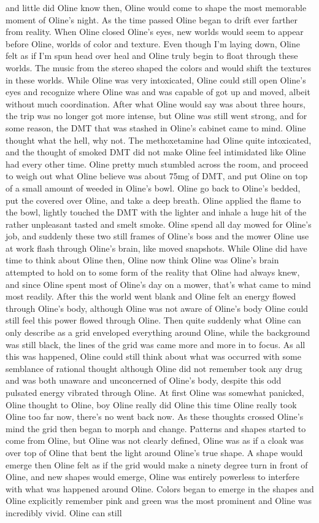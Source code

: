 \documentclass[12pt]{book}
\begin{document}
and little did Oline know then, Oline would come to shape the most memorable moment of Oline's night. As the time passed Oline began to drift ever farther from reality. When Oline closed Oline's eyes, new worlds would seem to appear before Oline, worlds of color and texture. Even though I'm laying down, Oline felt as if I'm spun head over heal and Oline truly begin to float through these worlds. The music from the stereo shaped the colors and would shift the textures in these worlds. While Oline was very intoxicated, Oline could still open Oline's eyes and recognize where Oline was and was capable of got up and moved, albeit without much coordination. After what Oline would say was about three hours, the trip was no longer got more intense, but Oline was still went strong, and for some reason, the DMT that was stashed in Oline's cabinet came to mind. Oline thought what the hell, why not. The methoxetamine had Oline quite intoxicated, and the thought of smoked DMT did not make Oline feel intimidated like Oline had every other time. Oline pretty much stumbled across the room, and proceed to weigh out what Oline believe was about 75mg of DMT, and put Oline on top of a small amount of weeded in Oline's bowl. Oline go back to Oline's bedded, put the covered over Oline, and take a deep breath. Oline applied the flame to the bowl, lightly touched the DMT with the lighter and inhale a huge hit of the rather unpleasant tasted and smelt smoke. Oline spend all day mowed for Oline's job, and suddenly these two still frames of Oline's boss and the mower Oline use at work flash through Oline's brain, like moved snapshots. While Oline did have time to think about Oline then, Oline now think Oline was Oline's brain attempted to hold on to some form of the reality that Oline had always knew, and since Oline spent most of Oline's day on a mower, that's what came to mind most readily. After this the world went blank and Oline felt an energy flowed through Oline's body, although Oline was not aware of Oline's body Oline could still feel this power flowed through Oline. Then quite suddenly what Oline can only describe as a grid enveloped everything around Oline, while the background was still black, the lines of the grid was came more and more in to focus. As all this was happened, Oline could still think about what was occurred with some semblance of rational thought although Oline did not remember took any drug and was both unaware and unconcerned of Oline's body, despite this odd pulsated energy vibrated through Oline. At first Oline was somewhat panicked, Oline thought to Oline, boy Oline really did Oline this time Oline really took Oline too far now, there's no went back now. As these thoughts crossed Oline's mind the grid then began to morph and change. Patterns and shapes started to come from Oline, but Oline was not clearly defined, Oline was as if a cloak was over top of Oline that bent the light around Oline's true shape. A shape would emerge then Oline felt as if the grid would make a ninety degree turn in front of Oline, and new shapes would emerge, Oline was entirely powerless to interfere with what was happened around Oline. Colors began to emerge in the shapes and Oline explicitly remember pink and green was the most prominent and Oline was incredibly vivid. Oline can still 
\end{document}
